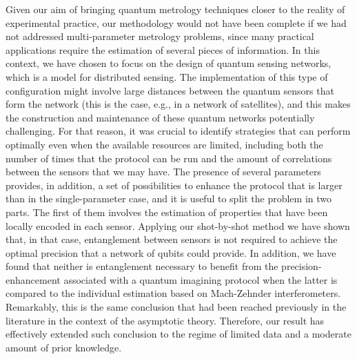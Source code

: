 Given our aim of bringing quantum metrology techniques closer to the reality of experimental practice, our methodology would not have been complete if we had not addressed multi-parameter metrology problems, since many practical applications require the estimation of several pieces of information. In this context, we have chosen to focus on the design of quantum sensing networks, which is a model for distributed sensing. The implementation of this type of configuration might involve large distances between the quantum sensors that form the network (this is the case, e.g., in a network of satellites), and this makes the construction  and maintenance of these quantum networks potentially challenging. For that reason, it was crucial to identify strategies that can perform optimally even when the available resources are limited, including both the number of times that the protocol can be run and the amount of correlations between the sensors that we may have. The presence of several parameters provides, in addition, a set of possibilities to enhance the protocol that is larger than in the single-parameter case, and it is useful to split the problem in two parts. The first of them involves the estimation of properties that have been locally encoded in each sensor. Applying our shot-by-shot method we have shown that, in that case, entanglement between sensors is not required to achieve the optimal precision that a network of qubits could provide. In addition, we have found that neither is entanglement necessary to benefit from the precision-enhancement associated with a quantum imagining protocol when the latter is compared to the individual estimation based on Mach-Zehnder interferometers. Remarkably, this is the same conclusion that had been reached previously in the literature in the context of the asymptotic theory. Therefore, our result has effectively extended such conclusion to the regime of limited data and a moderate amount of prior knowledge.

